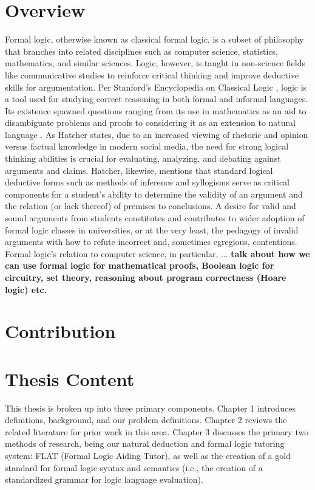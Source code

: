 \documentclass[ms]{uncgdissertationexp2}
\theoremstyle{plain}
\theoremstyle{definition}
\theoremstyle{remark}
\begin{document}
\section{Overview}
Formal logic, otherwise known as classical formal logic, is a subset of philosophy that branches into related disciplines such as computer science, statistics, mathematics, and similar sciences. Logic, however, is taught in non-science fields like communicative studies to reinforce critical thinking and improve deductive skills for argumentation. Per Stanford's Encyclopedia on Classical Logic \cite{stanfordencyclopedia}, logic is a tool used for studying correct reasoning in both formal and informal languages. Its existence spawned questions ranging from its use in mathematics as an aid to disambiguate problems and proofs to considering it as an extension to natural language \cite{stanfordencyclopedia}. As Hatcher \cite{hatcher} states, due to an increased viewing of rhetoric and opinion versus factual knowledge in modern social media, the need for strong logical thinking abilities is crucial for evaluating, analyzing, and debating against arguments and claims. Hatcher, likewise, mentions that standard logical deductive forms such as methods of inference and syllogisms serve as critical components for a student's ability to determine the validity of an argument and the relation (or lack thereof) of premises to conclusions. A desire for valid and sound arguments from students constitutes and contributes to wider adoption of formal logic classes in universities, or at the very least, the pedagogy of invalid arguments with how to refute incorrect and, sometimes egregious, contentions.  Formal logic's relation to computer science, in particular, ... \textbf{talk about how we can use formal logic for mathematical proofs, Boolean logic for circuitry, set theory, reasoning about program correctness (Hoare logic) etc.}
\section{Contribution}
\section{Thesis Content}
This thesis is broken up into three primary components. Chapter 1 introduces definitions, background, and our problem definitions. Chapter 2 reviews the related literature for prior work in this area. Chapter 3 discusses the primary two methods of research, being our natural deduction and formal logic tutoring system: FLAT (Formal Logic Aiding Tutor), as well as the creation of a gold standard for formal logic syntax and semantics (i.e., the creation of a standardized grammar for logic language evaluation).
\end{document}

